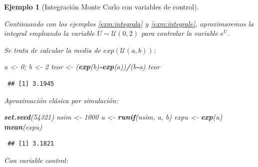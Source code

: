 \documentclass[
  spanish,
  10pt,
]{book}
\newenvironment{Shaded}{\begin{snugshade}}{\end{snugshade}}
\newcommand{\AttributeTok}[1]{\textcolor[rgb]{0.13,0.29,0.53}{#1}}
\newcommand{\CommentTok}[1]{\textcolor[rgb]{0.56,0.35,0.01}{\textit{#1}}}
\newcommand{\DecValTok}[1]{\textcolor[rgb]{0.00,0.00,0.81}{#1}}
\newcommand{\FunctionTok}[1]{\textcolor[rgb]{0.13,0.29,0.53}{\textbf{#1}}}
\newcommand{\NormalTok}[1]{#1}
\newcommand{\OtherTok}[1]{\textcolor[rgb]{0.56,0.35,0.01}{#1}}
\newcommand{\SpecialCharTok}[1]{\textcolor[rgb]{0.81,0.36,0.00}{\textbf{#1}}}
\newcommand{\StringTok}[1]{\textcolor[rgb]{0.31,0.60,0.02}{#1}}
\theoremstyle{break}
\newtheorem{example}{Ejemplo}[chapter]
\theoremstyle{nonumberplain}
\renewcommand{\CommentTok}[1]{\textcolor[rgb]{0.41,0.41,0.41}{\texttt{#1}}}
\begin{document}
\begin{example}[Integración Monte Carlo con variables de control]
\protect\hypertarget{exm:integral-contr}{}\label{exm:integral-contr}

Continuando con los ejemplos \ref{exm:integrala} y \ref{exm:integrale}, aproximaremos la integral empleando la variable \(U\sim\mathcal{U}(0,2)\) para controlar la variable \(e^{U}\).

Se trata de calcular la media de \(exp(\mathcal{U}(a,b))\):

\begin{Shaded}
\begin{Highlighting}[]
\NormalTok{a }\OtherTok{\textless{}{-}} \DecValTok{0}\NormalTok{; b }\OtherTok{\textless{}{-}} \DecValTok{2}
\NormalTok{teor }\OtherTok{\textless{}{-}}\NormalTok{ (}\FunctionTok{exp}\NormalTok{(b)}\SpecialCharTok{{-}}\FunctionTok{exp}\NormalTok{(a))}\SpecialCharTok{/}\NormalTok{(b}\SpecialCharTok{{-}}\NormalTok{a)}
\NormalTok{teor}
\end{Highlighting}
\end{Shaded}

\begin{verbatim}
 ## [1] 3.1945
\end{verbatim}

Aproximación clásica por simulación:

\begin{Shaded}
\begin{Highlighting}[]
\FunctionTok{set.seed}\NormalTok{(}\DecValTok{54321}\NormalTok{)}
\NormalTok{nsim }\OtherTok{\textless{}{-}} \DecValTok{1000}
\NormalTok{u }\OtherTok{\textless{}{-}} \FunctionTok{runif}\NormalTok{(nsim, a, b)}
\NormalTok{expu }\OtherTok{\textless{}{-}} \FunctionTok{exp}\NormalTok{(u)}
\FunctionTok{mean}\NormalTok{(expu) }
\end{Highlighting}
\end{Shaded}

\begin{verbatim}
 ## [1] 3.1821
\end{verbatim}

Con variable control:

\begin{Shaded}
\end{Shaded}


\end{example}
\end{document}
